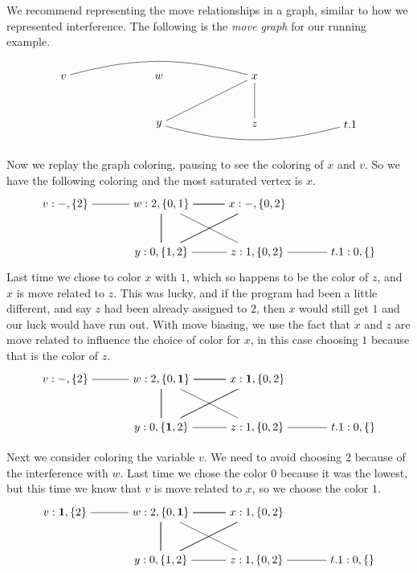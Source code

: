 \documentclass[11pt]{book}
\begin{document}
We recommend representing the move relationships in a graph, similar
to how we represented interference.  The following is the \emph{move
  graph} for our running example.
\[
\begin{tikzpicture}[baseline=(current  bounding  box.center)]
\node (v) at (0,0)    {$v$};
\node (w) at (3,0)    {$w$};
\node (x) at (6,0)    {$x$};
\node (y) at (3,-1.5) {$y$};
\node (z) at (6,-1.5) {$z$};
\node (t1) at (9,-1.5)   {$t.1$};
\draw[bend left=15] (t1) to (y);
\draw[bend left=15] (v) to (x);
\draw (x) to (y);
\draw (x) to (z);
\end{tikzpicture}
\]

Now we replay the graph coloring, pausing to see the coloring of $x$
and $v$. So we have the following coloring and the most saturated
vertex is $x$.
\[
\begin{tikzpicture}[baseline=(current  bounding  box.center)]
\node (v) at (0,0)   {$v:-,\{2\}$};
\node (w) at (3,0)   {$w:2,\{0,1\}$};
\node (x) at (6,0)   {$x:-,\{0,2\}$};
\node (y) at (3,-1.5)  {$y:0,\{1,2\}$};
\node (z) at (6,-1.5)  {$z:1,\{0,2\}$};
\node (t1) at (9,-1.5)   {$t.1:0,\{\}$};
\draw (t1) to (z);
\draw (v) to (w);
\foreach \i in {w,x,y}
{
  \foreach \j in {w,x,y}
  {
    \draw (\i) to (\j);
  }
}
\draw (z) to (w);
\draw (z) to (y);
\end{tikzpicture}
\]
Last time we chose to color $x$ with $1$,
%
which so happens to be the color of $z$, and $x$ is move related to
$z$. This was lucky, and if the program had been a little different,
and say $z$ had been already assigned to $2$, then $x$ would still get
$1$ and our luck would have run out. With move biasing, we use the
fact that $x$ and $z$ are move related to influence the choice of
color for $x$, in this case choosing $1$ because that is the color of
$z$.
\[
\begin{tikzpicture}[baseline=(current  bounding  box.center)]
\node (v) at (0,0)   {$v:-,\{2\}$};
\node (w) at (3,0)   {$w:2,\{0,\mathbf{1}\}$};
\node (x) at (6,0)   {$x:\mathbf{1},\{0,2\}$};
\node (y) at (3,-1.5)  {$y:0,\{\mathbf{1},2\}$};
\node (z) at (6,-1.5)  {$z:1,\{0,2\}$};
\node (t1) at (9,-1.5)   {$t.1:0,\{\}$};
\draw (t1) to (z);
\draw (v) to (w);
\foreach \i in {w,x,y}
{
  \foreach \j in {w,x,y}
  {
    \draw (\i) to (\j);
  }
}
\draw (z) to (w);
\draw (z) to (y);
\end{tikzpicture}
\]

Next we consider coloring the variable $v$. We need to avoid choosing
$2$ because of the interference with $w$. Last time we chose the color
$0$ because it was the lowest, but this time we know that $v$ is move
related to $x$, so we choose the color $1$.
\[
\begin{tikzpicture}[baseline=(current  bounding  box.center)]
\node (v) at (0,0)   {$v:\mathbf{1},\{2\}$};
\node (w) at (3,0)   {$w:2,\{0,\mathbf{1}\}$};
\node (x) at (6,0)   {$x:1,\{0,2\}$};
\node (y) at (3,-1.5)  {$y:0,\{1,2\}$};
\node (z) at (6,-1.5)  {$z:1,\{0,2\}$};
\node (t1) at (9,-1.5)   {$t.1:0,\{\}$};
\draw (t1) to (z);
\draw (v) to (w);
\foreach \i in {w,x,y}
{
  \foreach \j in {w,x,y}
  {
    \draw (\i) to (\j);
  }
}
\draw (z) to (w);
\draw (z) to (y);
\end{tikzpicture}
\]
\end{document}
